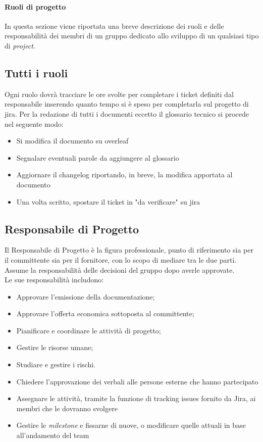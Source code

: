 \paragraph{Ruoli di progetto}
In questa sezione viene riportata una breve descrizione dei ruoli e delle responsabilità dei membri di un gruppo dedicato allo sviluppo di un qualsiasi tipo di \textit{project}.
\subsection{Tutti i ruoli}
Ogni ruolo dovrà tracciare le ore svolte per completare i ticket definiti dal responsabile inserendo quanto tempo si è speso per completarla sul progetto di jira.
Per la redazione di tutti i documenti eccetto il glossario tecnico si procede nel seguente modo:
\begin{itemize}
    \item Si modifica il documento su overleaf
    \item Segnalare eventuali parole da aggiungere al glossario
    \item Aggiornare il changelog riportando, in breve, la modifica apportata al documento
    \item Una volta scritto, spostare il ticket in "da verificare" su jira
\end{itemize}
\subsection{Responsabile di Progetto}
Il Responsabile di Progetto è la figura professionale, punto di riferimento sia per il committente sia per il fornitore, con lo scopo di
mediare tra le due parti. Assume la responsabilità delle decisioni del gruppo dopo averle approvate.\\
Le sue responsabilità includono:
\begin{itemize}
    \item Approvare l’emissione della documentazione;
    \item Approvare l’offerta economica sottoposta al committente;
    \item Pianificare e coordinare le attività di progetto;
    \item Gestire le risorse umane;
    \item Studiare e gestire i  rischi.
    \item Chiedere l'approvazione dei verbali alle persone esterne che hanno partecipato
    \item Assegnare le attività, tramite la funzione di tracking issues fornito da Jira, ai membri che le dovranno svolgere
    \item Gestire le \textit{milestone} e fissarne di nuove, o modificare quelle attuali in base all'andamento del team
\end{itemize}
